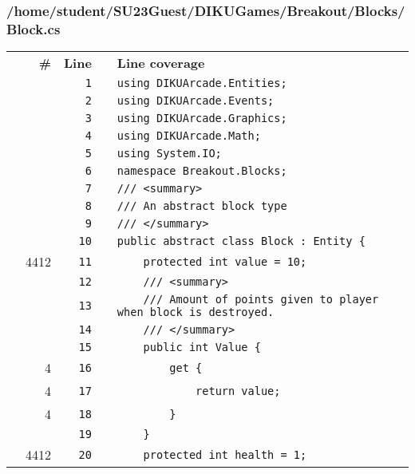 \documentclass[a4paper,landscape,10pt]{article}
\begin{document}
\subsubsection{/home/student/SU23Guest/DIKUGames/Breakout/Blocks/Block.cs}
\begin{longtable}[l]{lrrll}
\textbf{} & \textbf{\#} & \textbf{Line} & \textbf{} & \textbf{Line coverage}\\
\cellcolor{gray} &  & \verb~1~ & & \verb~using DIKUArcade.Entities;~\\
\cellcolor{gray} &  & \verb~2~ & & \verb~using DIKUArcade.Events;~\\
\cellcolor{gray} &  & \verb~3~ & & \verb~using DIKUArcade.Graphics;~\\
\cellcolor{gray} &  & \verb~4~ & & \verb~using DIKUArcade.Math;~\\
\cellcolor{gray} &  & \verb~5~ & & \verb~using System.IO;~\\
\cellcolor{gray} &  & \verb~6~ & & \verb~namespace Breakout.Blocks;~\\
\cellcolor{gray} &  & \verb~7~ & & \verb~/// <summary>~\\
\cellcolor{gray} &  & \verb~8~ & & \verb~/// An abstract block type~\\
\cellcolor{gray} &  & \verb~9~ & & \verb~/// </summary>~\\
\cellcolor{gray} &  & \verb~10~ & & \verb~public abstract class Block : Entity {~\\
\cellcolor{green} & 4412 & \verb~11~ & & \verb~    protected int value = 10;~\\
\cellcolor{gray} &  & \verb~12~ & & \verb~    /// <summary>~\\
\cellcolor{gray} &  & \verb~13~ & & \verb~    /// Amount of points given to player when block is destroyed.~\\
\cellcolor{gray} &  & \verb~14~ & & \verb~    /// </summary>~\\
\cellcolor{gray} &  & \verb~15~ & & \verb~    public int Value {~\\
\cellcolor{green} & 4 & \verb~16~ & & \verb~        get {~\\
\cellcolor{green} & 4 & \verb~17~ & & \verb~            return value;~\\
\cellcolor{green} & 4 & \verb~18~ & & \verb~        }~\\
\cellcolor{gray} &  & \verb~19~ & & \verb~    }~\\
\cellcolor{green} & 4412 & \verb~20~ & & \verb~    protected int health = 1;~\\

\end{longtable}
\end{document}
